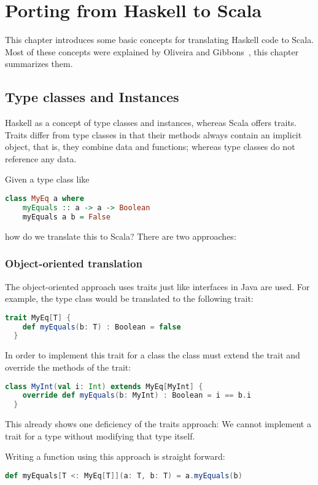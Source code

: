 \chapter{Porting from Haskell to Scala}

This chapter introduces some basic concepts for translating Haskell code
to Scala. Most of these concepts were explained by Oliveira and Gibbons~\cite{scalagp}, this
chapter summarizes them.

\section{Type classes and Instances}

Haskell as a concept of type classes and instances, whereas Scala offers
traits. Traits differ from type classes in that their methods always contain
an implicit  object, that is, they combine data and functions;
whereas type classes do not reference any data.

Given a type class like
\begin{lstlisting}[language=Haskell,gobble=6]
  class MyEq a where
    myEquals :: a -> a -> Boolean
    myEquals a b = False
\end{lstlisting}
how do we translate this to Scala? There are two approaches:

\subsection{Object-oriented translation}
The object-oriented approach uses traits just like interfaces in
Java are used. For example, the  type class would be translated
to the following trait:
\begin{lstlisting}[language=Scala,gobble=6]
  trait MyEq[T] {
    def myEquals(b: T) : Boolean = false
  }
\end{lstlisting}
In order to implement this trait for a class the class must extend the
trait and override the methods of the trait:
\begin{lstlisting}[language=Scala,gobble=6]
  class MyInt(val i: Int) extends MyEq[MyInt] {
    override def myEquals(b: MyInt) : Boolean = i == b.i
  }
\end{lstlisting}
This already shows one deficiency of the traits approach: We cannot
implement a trait for a type without modifying that type itself.

Writing a function using this approach is straight forward:
\begin{lstlisting}[language=Scala,gobble=6]
  def myEquals[T <: MyEq[T]](a: T, b: T) = a.myEquals(b)
\end{lstlisting}

